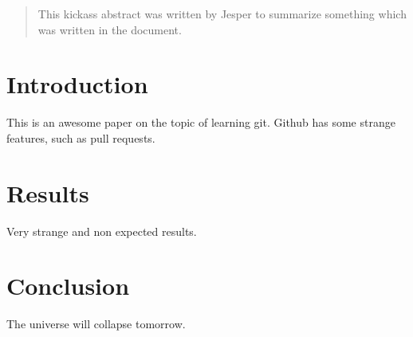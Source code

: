 \documentclass{article}
\begin{document}
\begin{abstract}
This kickass abstract was written by Jesper to summarize something which was written in the document.
\end{abstract}

\section{Introduction}

This is an awesome paper on the topic of learning git.
Github has some strange features, such as pull requests.

\section{Results}

Very strange and non expected results.  

\section{Conclusion}

The universe will collapse tomorrow.
\end{document}

